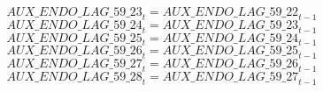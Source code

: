\begin{dmath}
{AUX\_ENDO\_LAG\_59\_23}_{t}={AUX\_ENDO\_LAG\_59\_22}_{t-1}
\end{dmath}
\begin{dmath}
{AUX\_ENDO\_LAG\_59\_24}_{t}={AUX\_ENDO\_LAG\_59\_23}_{t-1}
\end{dmath}
\begin{dmath}
{AUX\_ENDO\_LAG\_59\_25}_{t}={AUX\_ENDO\_LAG\_59\_24}_{t-1}
\end{dmath}
\begin{dmath}
{AUX\_ENDO\_LAG\_59\_26}_{t}={AUX\_ENDO\_LAG\_59\_25}_{t-1}
\end{dmath}
\begin{dmath}
{AUX\_ENDO\_LAG\_59\_27}_{t}={AUX\_ENDO\_LAG\_59\_26}_{t-1}
\end{dmath}
\begin{dmath}
{AUX\_ENDO\_LAG\_59\_28}_{t}={AUX\_ENDO\_LAG\_59\_27}_{t-1}
\end{dmath}
